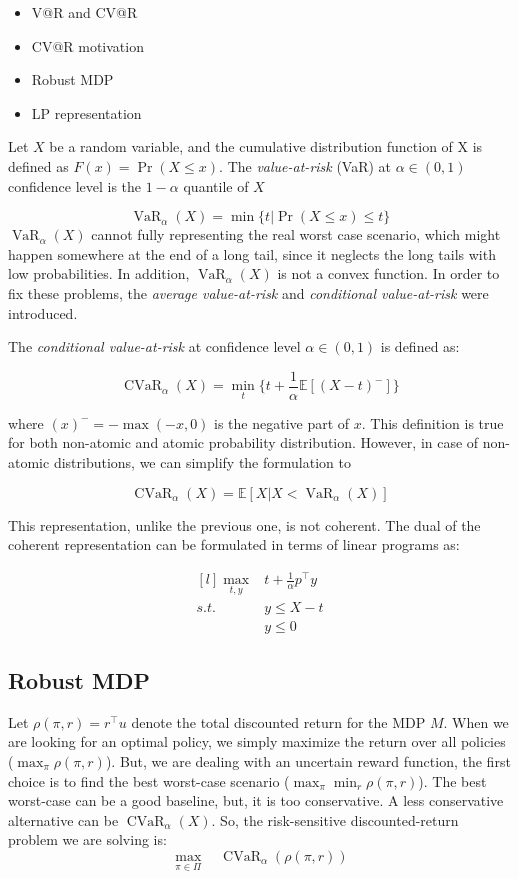 \documentclass{article}
\theoremstyle{remark}
\theoremstyle{remark}
\theoremstyle{remark}
\theoremstyle{remark}
\theoremstyle{remark}
\theoremstyle{remark}
\newcommand{\valatrisk}[2]{\operatorname{VaR}_{#1}(#2)}
\newcommand{\cvalatrisk}[2]{\operatorname{CVaR}_{#1}(#2)}
\begin{document}
\begin{itemize}
  \item V@R and CV@R
  \item CV@R motivation
  \item Robust MDP
  \item LP representation
\end{itemize}

Let $X$ be a random variable, and the cumulative distribution function of X is defined as $F(x) = \Pr (X \leq x)$. The \textit{value-at-risk} (VaR) at $\alpha \in (0,1)$ confidence level is the $1-\alpha$ quantile of $X$

\[
  \valatrisk{\alpha}{X} = \min\{t | \Pr (X \leq x) \leq t\}
\]
$\valatrisk{\alpha}{X}$ cannot fully representing the real worst case scenario, which might happen somewhere at the end of a long tail, since it neglects the long tails with low probabilities. In addition, $\valatrisk{\alpha}{X}$ is not a convex function. In order to fix these problems, the \textit{average value-at-risk} and \textit{conditional value-at-risk} were introduced.


The \textit{conditional value-at-risk} at confidence level $\alpha \in (0,1)$ is defined as:

\[
  \cvalatrisk{\alpha}{X} = \min_t \{ t + \frac{1}{\alpha} \mathbb{E}[(X-t)^-] \}
\]

where $(x)^- = -\max(-x, 0)$ is the negative part of $x$. This definition is true for both non-atomic and atomic probability distribution. However, in case of non-atomic distributions, we can simplify the formulation to

\[
  \cvalatrisk{\alpha}{X} = \mathbb{E}[X | X < \valatrisk{\alpha}{X}]
\]

This representation, unlike the previous one, is not coherent. The dual of the coherent representation can be formulated in terms of linear programs as:

\[
\begin{matrix*}[l]
  \max_{t,y} & t+ \frac{1}{\alpha} p^\top y \\
  s.t. & y \leq X - t \\
   & y \leq 0
\end{matrix*}
\]

\subsection*{Robust MDP}

Let $\rho(\pi, r) = r^\top u$ denote the total discounted return for the MDP $M$. When we are looking for an optimal policy, we simply maximize the return over all policies ($\max_\pi \rho(\pi, r)$). But, we are dealing with an uncertain reward function, the first choice is to find the best worst-case scenario ($\max_\pi \min_r \rho(\pi, r)$). The best worst-case can be a good baseline, but, it is too conservative. A less conservative alternative can be $\cvalatrisk{\alpha}{X}$. So, the risk-sensitive discounted-return problem we are solving is\cite{Chow2015}:
\[
  \max\limits_{\pi \in \Pi} \quad \cvalatrisk{\alpha}{\rho(\pi, r)}
\]
\end{document}
